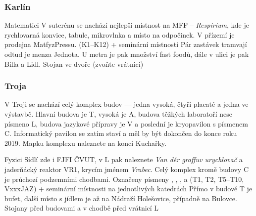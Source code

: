 \subsubsection{Karlín}

{Matematici}
{V suterénu se nachází nejlepší místnost na MFF -- \textit{Respirium}, kde je
rychlovarná konvice, tabule, mikrovlnka a místo na odpočinek. V přízemí je
prodejna MatfyzPressu.}
{ (K1--K12) + seminární místnosti}
{Pár zastávek tramvají odtud je menza Jednota. U metra je pak množství fast
foodů, dále v ulici je pak Billa a Lidl.}
{Stojan ve dvoře (zvoňte vrátnici)}

\subsubsection{Troja}
V Troji se nachází celý komplex budov –– jedna vysoká, čtyři placaté a jedna ve
výstavbě. Hlavní budova je T, vysoká je A, budova těžkých laboratoří nese
písmeno L, budova jazykové přípravy je V a poslední je kryopavilon s písmenem C.
Informatický pavilon se zatím staví a měl by být dokončen do konce roku 2019.
Mapku komplexu naleznete na konci Kuchařky.

{Fyzici}
{Sídlí zde i FJFI ČVUT, v L pak naleznete \textit{Van děr graffuv urychlovač} a
jaderňácký reaktor VR1, krycím jménem
\textit{Vrabec}. Celý komplex kromě budovy C je průchozí podzemními chodbami.}
{Označeny písmeny , , ,  a  (T1, T2, T5--T10,
VxxxJAZ) + seminární místnosti na
jednotlivých katedrách}
{Přímo v budově T je bufet, další místo s jídlem je až na Nádraží Holešovice,
případně na Bulovce.}
{Stojany před budovami a v chodbě před vrátnicí L}